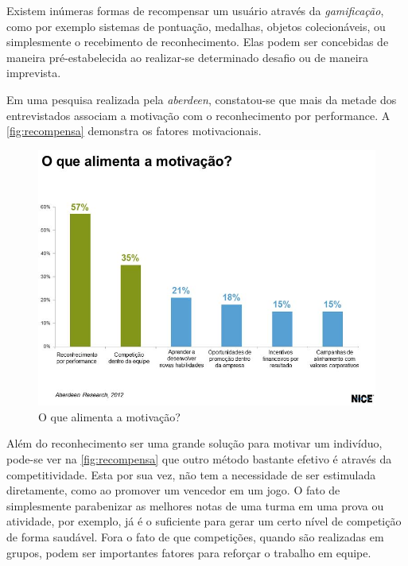 \documentclass[
    12pt,               %
    openright,          %
    oneside,
    a4paper,            %
    english,            %
    brazil              %
    ]{ifsp-spo-inf-ctds} %
\begin{document}
Existem inúmeras formas de recompensar um usuário através da \textit{gamificação}, como por exemplo sistemas de pontuação, medalhas, objetos colecionáveis, ou simplesmente o recebimento de reconhecimento. Elas podem ser concebidas de maneira pré-estabelecida ao realizar-se determinado desafio ou de maneira imprevista.


Em uma pesquisa realizada pela \textit{\gls{aberdeen}}, constatou-se que mais da metade dos entrevistados associam a motivação com o reconhecimento por performance. A \autoref{fig:recompensa} demonstra os fatores motivacionais.

\begin{figure}[htb]
    \centering
	\includegraphics[width=16cm]{imagens/recompensa.jpg}
	\caption{\label{fig:recompensa}O que alimenta a motivação?}
\end{figure}

Além do reconhecimento ser uma grande solução para motivar um indivíduo, pode-se ver na \autoref{fig:recompensa} que outro método bastante efetivo é através da competitividade. Esta por sua vez, não tem a necessidade de ser estimulada diretamente, como ao promover um vencedor em um jogo. O fato de simplesmente parabenizar as melhores notas de uma turma em uma prova ou atividade, por exemplo, já é o suficiente para gerar um certo nível de competição de forma saudável. Fora o fato de que competições, quando são realizadas em grupos, podem ser importantes fatores para reforçar o trabalho em equipe.

\FloatBarrier

\end{document}
